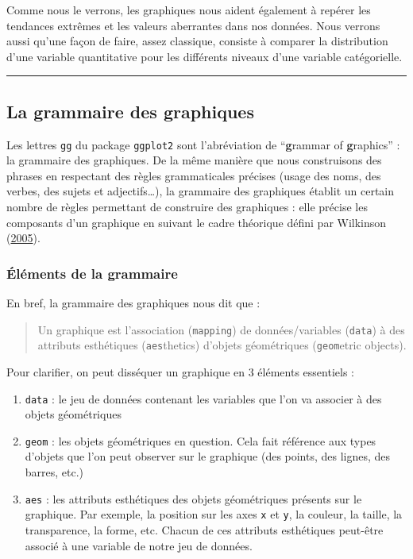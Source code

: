 \documentclass[a4paperpaper,]{article}
\providecommand{\tightlist}{%
  \setlength{\itemsep}{0pt}\setlength{\parskip}{0pt}}
\begin{document}
Comme nous le verrons, les graphiques nous aident également à repérer les tendances extrêmes et les valeurs aberrantes dans nos données. Nous verrons aussi qu'une façon de faire, assez classique, consiste à comparer la distribution d'une variable quantitative pour les différents niveaux d'une variable catégorielle.

\begin{center}\rule{0.5\linewidth}{\linethickness}\end{center}

\hypertarget{gggraph}{%
\subsection{La grammaire des graphiques}\label{gggraph}}

Les lettres \texttt{gg} du package \texttt{ggplot2} sont l'abréviation de ``\textbf{g}rammar of \textbf{g}raphics'' : la grammaire des graphiques. De la même manière que nous construisons des phrases en respectant des règles grammaticales précises (usage des noms, des verbes, des sujets et adjectifs\ldots{}), la grammaire des graphiques établit un certain nombre de règles permettant de construire des graphiques : elle précise les composants d'un graphique en suivant le cadre théorique défini par Wilkinson (\protect\hyperlink{ref-wilkinson2005}{2005}).

\hypertarget{elements-de-la-grammaire}{%
\subsubsection{Éléments de la grammaire}\label{elements-de-la-grammaire}}

En bref, la grammaire des graphiques nous dit que :

\begin{quote}
Un graphique est l'association (\texttt{mapping}) de données/variables (\texttt{data}) à des attributs esthétiques (\texttt{aes}thetics) d'objets géométriques (\texttt{geom}etric objects).
\end{quote}

Pour clarifier, on peut disséquer un graphique en 3 éléments essentiels :

\begin{enumerate}
\def\labelenumi{\arabic{enumi}.}
\tightlist
\item
  \texttt{data} : le jeu de données contenant les variables que l'on va associer à des objets géométriques
\item
  \texttt{geom} : les objets géométriques en question. Cela fait référence aux types d'objets que l'on peut observer sur le graphique (des points, des lignes, des barres, etc.)
\item
  \texttt{aes} : les attributs esthétiques des objets géométriques présents sur le graphique. Par exemple, la position sur les axes \texttt{x} et \texttt{y}, la couleur, la taille, la transparence, la forme, etc. Chacun de ces attributs esthétiques peut-être associé à une variable de notre jeu de données.
\end{enumerate}
\end{document}
